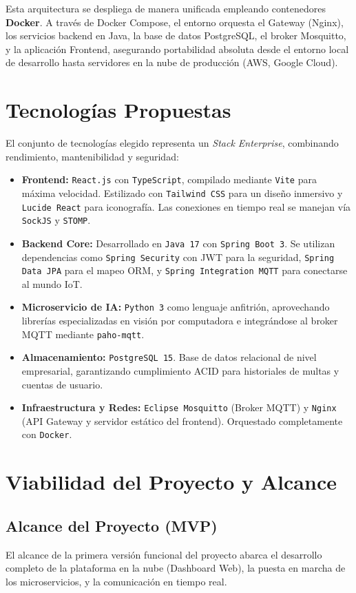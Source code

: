 \documentclass[12pt,a4paper]{article}
\begin{document}
Esta arquitectura se despliega de manera unificada empleando contenedores \textbf{Docker}. A través de Docker Compose, el entorno orquesta el Gateway (Nginx), los servicios backend en Java, la base de datos PostgreSQL, el broker Mosquitto, y la aplicación Frontend, asegurando portabilidad absoluta desde el entorno local de desarrollo hasta servidores en la nube de producción (AWS, Google Cloud).

\section{Tecnologías Propuestas}
El conjunto de tecnologías elegido representa un \textit{Stack Enterprise}, combinando rendimiento, mantenibilidad y seguridad:
\begin{itemize}
    \item \textbf{Frontend:} \texttt{React.js} con \texttt{TypeScript}, compilado mediante \texttt{Vite} para máxima velocidad. Estilizado con \texttt{Tailwind CSS} para un diseño inmersivo y \texttt{Lucide React} para iconografía. Las conexiones en tiempo real se manejan vía \texttt{SockJS} y \texttt{STOMP}.
    \item \textbf{Backend Core:} Desarrollado en \texttt{Java 17} con \texttt{Spring Boot 3}. Se utilizan dependencias como \texttt{Spring Security} con JWT para la seguridad, \texttt{Spring Data JPA} para el mapeo ORM, y \texttt{Spring Integration MQTT} para conectarse al mundo IoT.
    \item \textbf{Microservicio de IA:} \texttt{Python 3} como lenguaje anfitrión, aprovechando librerías especializadas en visión por computadora e integrándose al broker MQTT mediante \texttt{paho-mqtt}.
    \item \textbf{Almacenamiento:} \texttt{PostgreSQL 15}. Base de datos relacional de nivel empresarial, garantizando cumplimiento ACID para historiales de multas y cuentas de usuario.
    \item \textbf{Infraestructura y Redes:} \texttt{Eclipse Mosquitto} (Broker MQTT) y \texttt{Nginx} (API Gateway y servidor estático del frontend). Orquestado completamente con \texttt{Docker}.
\end{itemize}

\section{Viabilidad del Proyecto y Alcance}

\subsection{Alcance del Proyecto (MVP)}
El alcance de la primera versión funcional del proyecto abarca el desarrollo completo de la plataforma en la nube (Dashboard Web), la puesta en marcha de los microservicios, y la comunicación en tiempo real. 
\end{document}
